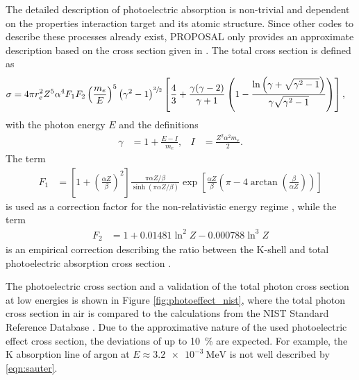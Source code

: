 The detailed description of photoelectric absorption is non-trivial and dependent on the properties interaction target and its atomic structure.
Since other codes to describe these processes already exist, PROPOSAL only provides an approximate description based on the cross section given in \cite{heitler, sauter}.
The total cross section is defined as
%
\begin{align}
	\label{eqn:sauter}
	\sigma &= 4 \pi r_e^2 Z^5 \alpha^4 F_1 F_2 \left( \frac{m_e}{E} \right)^5 \left( \gamma^2 -1 \right)^{\sfrac{3}{2}} \left[ \frac{4}{3} + \frac{\gamma (\gamma - 2)}{\gamma + 1} \left( 1 - \frac{\ln{\left( \gamma + \sqrt{\gamma^2 - 1} \right)}}{\gamma \sqrt{\gamma^2 - 1}}  \right) \right],
\end{align}
%
with the photon energy $E$ and the definitions
\begin{align}
	\gamma &= 1 + \frac{E - I}{m_e}, & I &= \frac{Z^2 \alpha^2 m_e}{2}.
\end{align}
%
The term
\begin{align}
	F_1 &= \left[ 1 + \left( \frac{\alpha Z}{\beta} \right)^2 \right] \frac{\pi \alpha Z / \beta }{\sinh(\pi \alpha Z / \beta )} \exp\left[ \frac{\alpha Z}{\beta} \left( \pi - 4 \arctan\left( \frac{\beta}{\alpha Z} \right) \right) \right]
\end{align}
%
is used as a correction factor for the non-relativistic energy regime \cite{sauter}, while the term
%
\begin{align}
	F_2 &= 1 + 0.01481 \ln^2{Z} - 0.000788 \ln^3{Z}
\end{align}
%
is an empirical correction describing the ratio between the K-shell and total photoelectric absorption cross section \cite{hubbell1969}.

The photoelectric cross section and a validation of the total photon cross section at low energies is shown in Figure \ref{fig:photoeffect_nist}, where the total photon cross section in air is compared to the calculations from the NIST Standard Reference Database \cite{nist}.
Due to the approximative nature of the used photoelectric effect cross section, the deviations of up to \SI{10}{\percent} are expected.
For example, the K absorption line of argon at $E\approx\SI{3.2e-3}{\mega\electronvolt}$ is not well described by \eqref{eqn:sauter}.

